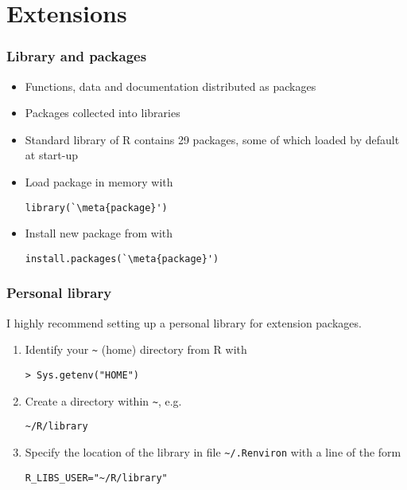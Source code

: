 \section{Extensions}

\begin{frame}[fragile=singleslide]
  \frametitle{Library and packages}

  \begin{itemize}
  \item Functions, data and documentation distributed as \alert{packages}
  \item Packages collected into \alert{libraries}
  \item Standard library of R contains 29 packages, some of which
    loaded by default at start-up
  \item Load package in memory with
    \begin{Schunk}
\begin{lstlisting}
library(`\meta{package}')
\end{lstlisting}
    \end{Schunk}
  \item Install new package from
     with
    \begin{Schunk}
\begin{lstlisting}
install.packages(`\meta{package}')
\end{lstlisting}
    \end{Schunk}
  \end{itemize}
\end{frame}

\begin{frame}[fragile=singleslide]
  \frametitle{Personal library}

  I highly recommend setting up a personal library for extension
  packages.

  \begin{enumerate}
  \item Identify your \verb=~= (\alert{home}) directory from R with
    \begin{Schunk}
\begin{lstlisting}
> Sys.getenv("HOME")
\end{lstlisting}
    \end{Schunk}
  \item Create a directory within \verb=~=, e.g.
    \begin{Schunk}
\begin{lstlisting}
~/R/library
\end{lstlisting}
    \end{Schunk}
  \item Specify the location of the library in file
    \verb=~/.Renviron= with a line of the form
    \begin{Schunk}
\begin{lstlisting}
R_LIBS_USER="~/R/library"
\end{lstlisting}
    \end{Schunk}
  \end{enumerate}

  \pause
\end{frame}

